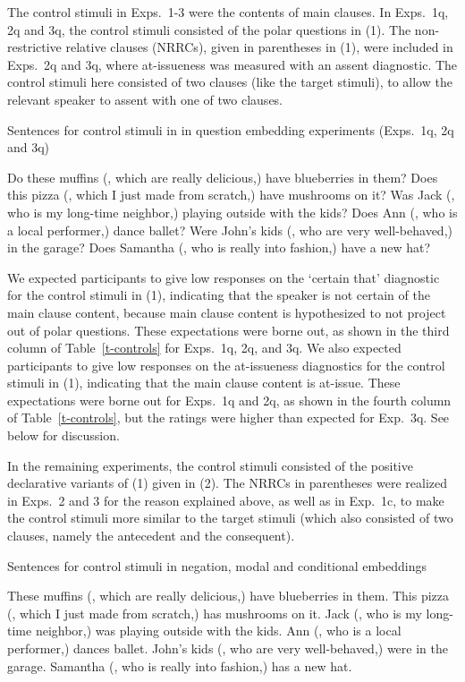 \documentclass[11pt,fleqn]{article}
\newcommand{\6}{\mbox{$[\hspace*{-.6mm}[$}}
\newcommand{\9}{\mbox{$]\hspace*{-.6mm}]$}}
\begin{document}
The control stimuli in Exps.~1-3 were the contents of main clauses. In Exps.~1q, 2q and 3q, the control stimuli consisted of the polar questions in (1). The non-restrictive relative clauses (NRRCs), given in parentheses in (1), were included in Exps.~2q and 3q, where at-issueness was measured with an assent diagnostic. The control stimuli here consisted of two clauses (like the target stimuli), to allow the relevant speaker to assent with one of two clauses.

\begin{exe}
 Sentences for control stimuli in in question embedding experiments (Exps.~1q, 2q and 3q)
\begin{xlist}
\ex Do these muffins (, which are really delicious,) have blueberries in them?
\ex Does this pizza (, which I just made from scratch,) have mushrooms on it? 
\ex Was Jack (, who is my long-time neighbor,) playing outside with the kids? 
\ex Does Ann (, who is a local performer,) dance ballet?
\ex Were John's kids (, who are very well-behaved,) in the garage?
\ex Does Samantha (, who is really into fashion,) have a new hat?
\end{xlist}
\end{exe}

We expected participants to give low responses on the `certain that' diagnostic for the control stimuli in (1), indicating that the speaker is not certain of the main clause content, because main clause content is hypothesized to not project out of polar questions. These expectations were borne out, as shown in the third column of Table~\ref{t-controls} for Exps.~1q, 2q, and 3q. We also expected participants to give low responses on the at-issueness diagnostics for the control stimuli in (1), indicating that the main clause content is at-issue. These expectations were borne out for Exps.~1q and 2q, as shown in the fourth column of Table~\ref{t-controls}, but the ratings were higher than expected for Exp.~3q. See below for discussion.


In the remaining experiments, the control stimuli consisted of the positive declarative variants of (1) given in (2). The NRRCs in parentheses were realized in Exps.~2 and 3 for the reason explained above, as well as in Exp.~1c, to make the control stimuli more similar to the target stimuli (which also consisted of two clauses, namely the antecedent and the consequent).

\begin{exe}
  Sentences for control stimuli in negation, modal and conditional embeddings
\begin{xlist}
\ex These muffins (, which are really delicious,) have blueberries in them.
\ex This pizza (, which I just made from scratch,) has mushrooms on it. 
\ex Jack (, who is my long-time neighbor,) was playing outside with the kids. 
\ex Ann (, who is a local performer,) dances ballet.
\ex John's kids (, who are very well-behaved,) were in the garage.
\ex Samantha (, who is really into fashion,) has a new hat.
\end{xlist}
\end{exe}
\end{document}
